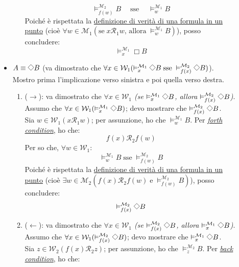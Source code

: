 \documentclass[a4paper,12pt]{article}
\newcommand{\latinmodern}[1]{\text{#1}}
\newcommand{\latinmath}[1]{\text{\latinmodern{#1}}} %
\newcommand{\Dmd}{\mathord{\vcenter{\hbox{\tikz[baseline=-0.6ex]{\draw[line width=0.4pt, scale=1, rotate=45] (0,0) rectangle (0.2,0.2);}}}}} %
\begin{document}
\begin{dimo}
\begin{description}
\begin{itemize}
\begin{enumerate}
				                  $$\vDash_{f(w)}^{\mathcal{M}_2} B \quad \; \text{sse} \quad \; \vDash_{w}^{\mathcal{M}_1} B$$
				                  Poiché è rispettata la \hyperlink{defverp}{definizione di verità di una formula in un punto} (cioè $\forall w \in \mathcal{M}_1 (\text{se} \; x\mathcal{R}_1w \text{, allora} \; \vDash_w^{\mathcal{M}_1} B)$), posso concludere:
				                  $$\vDash_x^{\mathcal{M}_1} \Box B$$
			            \end{enumerate}
			      \item $A \equiv \Dmd B$ (va dimostrato che \emph{$\forall x \in \mathcal{W}_1 (\vDash_x^{\mathcal{M}_1} \Dmd B \; \text{sse} \; \vDash_{f(x)}^{\mathcal{M}_2} \Dmd B)$}). Mostro prima l'implicazione verso sinistra e poi quella verso destra.
			            \begin{enumerate}
				            \item ($\to$): va dimostrato che \emph{$\forall x \in \mathcal{W}_1$ (se $\vDash_x^{\mathcal{M}_1} \Dmd B$, allora  $\vDash_{f(x)}^{\mathcal{M}_2} \Dmd B$)}. \\
				                  Assumo che $\forall x \in \mathcal{W}_1 (\vDash_x^{\mathcal{M}_1} \Dmd B)$; devo mostrare che $\vDash_{f(x)}^{\mathcal{M}_2} \Dmd B$. \\
				                  Sia $w \in \mathcal{W}_1 (x\mathcal{R}_1w)$; per assunzione, ho che $\vDash_{w}^{\mathcal{M}_1} B$. Per \hyperlink{forth}{\emph{forth condition}}, ho che:
				                  $$f(x)\mathcal{R}_2f(w)$$
				                  Per \latinmath{IH1} so che, $\forall w \in \mathcal{W}_1$:
				                  $$\vDash_{w}^{\mathcal{M}_1} B \; \text{sse} \; \vDash_{f(w)}^{\mathcal{M}_2} B$$
				                  Poiché è rispettata la \hyperlink{defverp}{definizione di verità di una formula in un punto} (cioè $\exists w \in \mathcal{M}_2 (f(x)\mathcal{R}_2f(w) \; \text{e} \; \vDash_{f(w)}^{\mathcal{M}_2} B)$), posso concludere:
				                  $$\vDash_{f(x)}^{\mathcal{M}_2} \Dmd B$$
				            \item ($\leftarrow$): va dimostrato che \emph{$\forall x \in \mathcal{W}_1$ (se $\vDash_{f(x)}^{\mathcal{M}_2} \Dmd B$, allora $\vDash_x^{\mathcal{M}_1} \Dmd B$)}. \\
				                  Assumo che $\forall x \in \mathcal{W}_1 (\vDash_{f(x)}^{\mathcal{M}_2} \Dmd B)$; devo mostrare che $\vDash_x^{\mathcal{M}_1} \Dmd B$. \\
				                  Sia $z \in \mathcal{W}_2 (f(x)\mathcal{R}_2z)$; per assunzione, ho che $\vDash_{z}^{\mathcal{M}_2} B$. Per \hyperlink{back}{\emph{back condition}}, ho che:

\end{enumerate}
\end{itemize}
\end{description}
\end{dimo}
\end{document}
